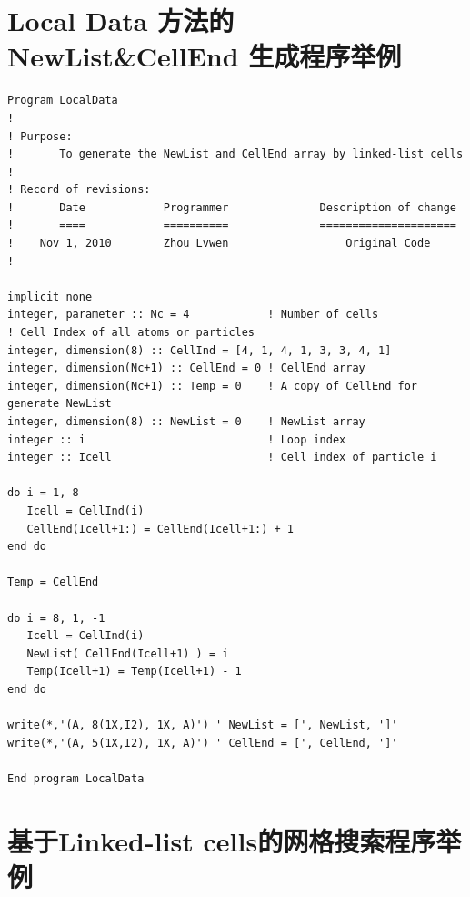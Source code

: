 \documentclass[a4paper]{article}
\begin{document}
\newpage

\appendix
\section{Local Data 方法的 NewList\&CellEnd 生成程序举例}

\begin{verbatim}
Program LocalData
!
! Purpose:
!       To generate the NewList and CellEnd array by linked-list cells
!
! Record of revisions:
!       Date            Programmer              Description of change
!       ====            ==========              =====================
!    Nov 1, 2010        Zhou Lvwen                  Original Code
!

implicit none
integer, parameter :: Nc = 4            ! Number of cells
! Cell Index of all atoms or particles
integer, dimension(8) :: CellInd = [4, 1, 4, 1, 3, 3, 4, 1]
integer, dimension(Nc+1) :: CellEnd = 0 ! CellEnd array
integer, dimension(Nc+1) :: Temp = 0    ! A copy of CellEnd for generate NewList
integer, dimension(8) :: NewList = 0    ! NewList array
integer :: i                            ! Loop index
integer :: Icell                        ! Cell index of particle i

do i = 1, 8
   Icell = CellInd(i)
   CellEnd(Icell+1:) = CellEnd(Icell+1:) + 1
end do

Temp = CellEnd

do i = 8, 1, -1
   Icell = CellInd(i)
   NewList( CellEnd(Icell+1) ) = i
   Temp(Icell+1) = Temp(Icell+1) - 1
end do

write(*,'(A, 8(1X,I2), 1X, A)') ' NewList = [', NewList, ']'
write(*,'(A, 5(1X,I2), 1X, A)') ' CellEnd = [', CellEnd, ']'

End program LocalData
\end{verbatim}

\newpage

\section{基于Linked-list cells的网格搜索程序举例}
\end{document}
